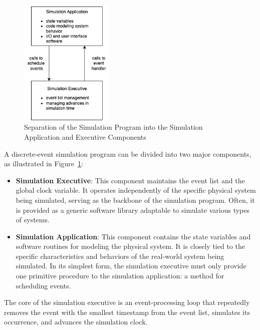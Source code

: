 \begin{figure}[H]
    \centering
    \includegraphics[width=0.4\textwidth]{images/simulationComponents.png}
    \caption{Separation of the Simulation Program into the Simulation Application and Executive Components}
    \label{fig:simComp}
\end{figure}

A discrete-event simulation program can be divided into two major components, as illustrated in Figure~\ref{fig:simComp}:

\begin{itemize}
    \item \textbf{Simulation Executive}: This component maintains the event list and the global clock variable. It operates independently of the specific physical system being simulated, serving as the backbone of the simulation program. Often, it is provided as a generic software library adaptable to simulate various types of systems.
    \item \textbf{Simulation Application}: This component contains the state variables and software routines for modeling the physical system. It is closely tied to the specific characteristics and behaviors of the real-world system being simulated. In its simplest form, the simulation executive must only provide one primitive procedure to the simulation application: a method for scheduling events.
\end{itemize}

The core of the simulation executive is an event-processing loop that repeatedly removes the event with the smallest timestamp from the event list, simulates its occurrence, and advances the simulation clock.
